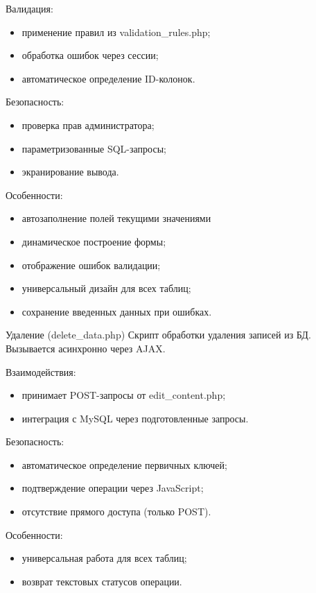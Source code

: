 Валидация:
\begin{itemize}
	\item применение правил из validation\_rules.php;
	\item обработка ошибок через сессии;
	\item автоматическое определение ID-колонок.
\end{itemize}

Безопасность:
\begin{itemize}
	\item проверка прав администратора;
	\item параметризованные SQL-запросы;
	\item экранирование вывода.
\end{itemize}

Особенности:
\begin{itemize}
	\item автозаполнение полей текущими значениями
	\item динамическое построение формы;
	\item отображение ошибок валидации;
	\item универсальный дизайн для всех таблиц;
	\item сохранение введенных данных при ошибках.
\end{itemize}

Удаление (delete\_data.php)
Скрипт обработки удаления записей из БД. Вызывается асинхронно через AJAX.

Взаимодействия:
\begin{itemize}
	\item принимает POST-запросы от edit\_content.php;
	\item интеграция с MySQL через подготовленные запросы.
\end{itemize}

Безопасность:
\begin{itemize}
	\item автоматическое определение первичных ключей;
	\item подтверждение операции через JavaScript;
	\item отсутствие прямого доступа (только POST).
\end{itemize}

Особенности:
\begin{itemize}
	\item универсальная работа для всех таблиц;
	\item возврат текстовых статусов операции.
\end{itemize}

